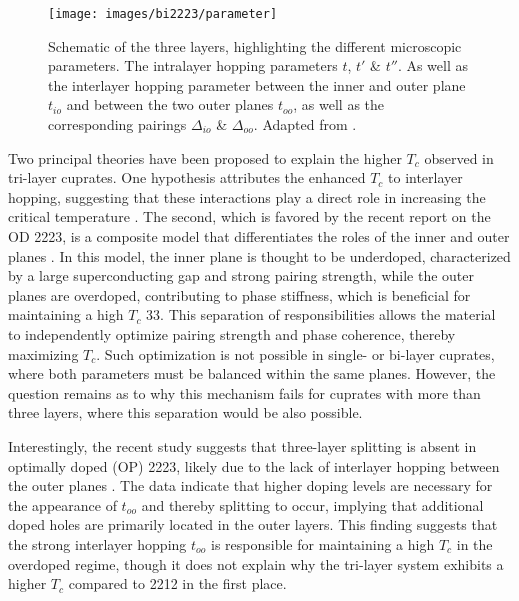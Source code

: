 \begin{figure}
	\centering
	\texttt{[image: images/bi2223/parameter]}
	\caption{Schematic of the three  layers, highlighting the different microscopic parameters. The intralayer hopping parameters $t$, $t'$ \& $t''$. As well as the interlayer hopping parameter between the inner and outer plane $t_{io}$ and between the two outer planes $t_{oo}$, as well as the corresponding pairings $\Delta_{io}$ \& $\Delta_{oo}$. Adapted from \cite{luo_electronic_2023}.}
	\label{fig:parameter}
\end{figure}


Two principal theories have been proposed to explain the higher $T_c$ observed in tri-layer cuprates.
One hypothesis attributes the enhanced $T_c$ to interlayer hopping, suggesting that these interactions play a direct role in increasing the critical temperature \cite{chakravarty_explanation_2004,nishiguchi_superconductivity_2013}.
The second, which is favored by the recent report on the OD 2223, is a composite model that differentiates the roles of the inner and outer planes \cite{kivelson_making_2002,berg_route_2008,okamoto_enhanced_2008}.
In this model, the inner plane is thought to be underdoped, characterized by a large superconducting gap and strong pairing strength, while the outer planes are overdoped, contributing to phase stiffness, which is beneficial for maintaining a high $T_c$ \cite{emery_importance_1995} 33.
This separation of responsibilities allows the material to independently optimize pairing strength and phase coherence, thereby maximizing $T_c$.
Such optimization is not possible in single- or bi-layer cuprates, where both parameters must be balanced within the same planes.
However, the question remains as to why this mechanism fails for cuprates with more than three  layers, where this separation would be also possible.

Interestingly, the recent study suggests that three-layer splitting is absent in optimally doped (OP) 2223, likely due to the lack of interlayer hopping between the outer planes \cite{luo_electronic_2023}.
The data indicate that higher doping levels are necessary for the appearance of $t_{oo}$ and thereby splitting to occur, implying that additional doped holes are primarily located in the outer layers.
This finding suggests that the strong interlayer hopping $t_{oo}$ is responsible for maintaining a high $T_c$ in the overdoped regime, though it does not explain why the tri-layer system exhibits a higher $T_c$ compared to 2212 in the first place.

